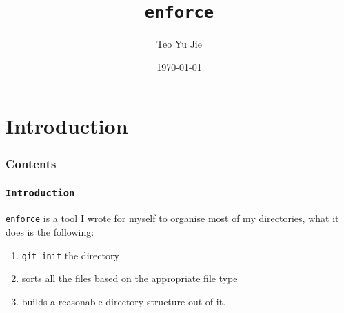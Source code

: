 \documentclass[%
  beameroptions={ignorenonframetext,11pt,169},
  articleoptions={11pt},
  also={trans,handout,article},
  ]{beamerswitch}
\title[\texttt{enforce}]{\texttt{enforce}}
\author[Teo Yu Jie]{Teo Yu Jie}
\date{\today}
\begin{document}
\maketitle

\section{Introduction}

\frame{\titlepage}

\begin{frame}
    \setcounter{footnote}{0}
    \frametitle{Contents}
    \tableofcontents
\end{frame}


\begin{frame}
    \frametitle{\texttt{Introduction}}
    \setcounter{footnote}{0}
    \setcounter{equation}{0}

    \texttt{enforce} is a tool I wrote for myself to organise
    most of my directories, what it does is the following:

    \begin{enumerate}
        \item \texttt{git init} the directory
        \item sorts all the files based on the appropriate file type
        \item builds a reasonable directory structure out of it.
    \end{enumerate}
\end{frame}
\end{document}
